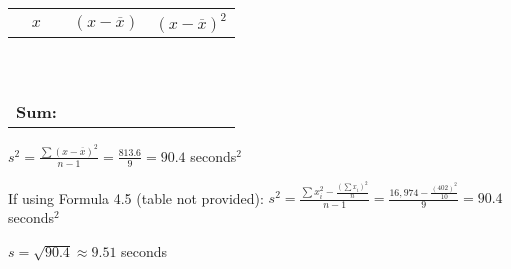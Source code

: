\documentclass[noanswers]{exam}
\begin{document}
\begin{questions}
\begin{parts}
	\begin{center}
	\begin{tabular}{|c|c|c|}
	\hline 
	\hspace{4mm} $x$ \hspace{4mm} & \hspace{7mm} $(x-\overline{x})$ \hspace{7mm} & \hspace{7mm} $(x-\overline{x})^2$ \hspace{7mm} \\
	\hline
	\fillin[$28$] & \fillin[$-12.2$] & \fillin[$148.84$] \\
	\hline
	\fillin[$32$] & \fillin[$-8.2$] & \fillin[$67.24$] \\
	\hline
	\fillin[$33$] & \fillin[$-7.2$] & \fillin[$51.84$] \\
	\hline
	\fillin[$35$] & \fillin[$-5.2$] & \fillin[$27.04$] \\
	\hline
	\fillin[$37$] & \fillin[$-3.2$] & \fillin[$10.24$] \\
	\hline
	\fillin[$39$] & \fillin[$-1.2$] & \fillin[$1.44$] \\
	\hline
	\fillin[$42$] & \fillin[$1.8$] & \fillin[$3.24$] \\
	\hline
	\fillin[$46$] & \fillin[$5.8$] & \fillin[$33.64$] \\
	\hline
	\fillin[$51$] & \fillin[$10.8$] & \fillin[$116.64$] \\
	\hline
	\fillin[$59$] & \fillin[$18.8$] & \fillin[$353.44$] \\
	\hline
	\textbf{Sum:} & \fillin[$0$] & \fillin[$813.6$] \\
	\hline
	\end{tabular}
	\end{center}
	
	\begin{solution}[\stretch{3}]
	
	\vspace{3mm}
	
	$\displaystyle s^2=\frac{\sum{(x-\overline{x})^2}}{n-1}=\frac{813.6}{9}=90.4$ seconds$^2$
	
	\vspace{1mm}
	
	If using Formula 4.5 (table not provided): $\displaystyle s^2=\frac{\sum x_i^2-\frac{(\sum x_i)^2}{n}}{n-1}=\frac{16,974-\frac{(402)^2}{10}}{9}=90.4$ seconds$^2$
	
	\vspace{3mm}
	
	$s=\sqrt{90.4}\approx 9.51$ seconds
	

\end{solution}
\end{parts}
\end{questions}
\end{document}
